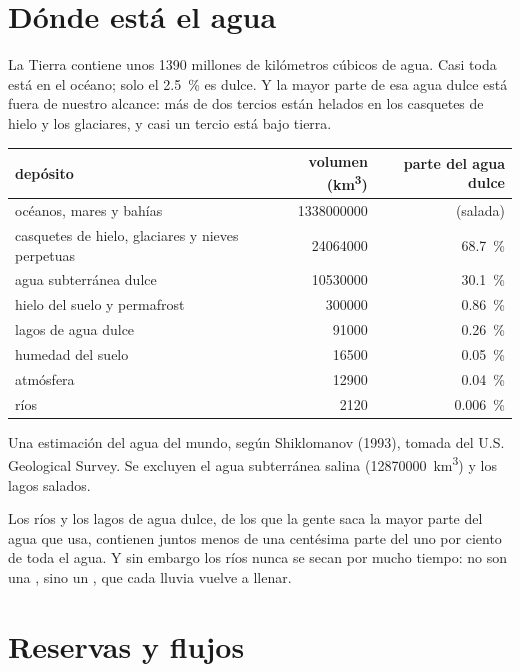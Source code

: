 \section{Dónde está el agua}

La Tierra contiene unos 1390 millones de kilómetros cúbicos de agua. Casi
toda está en el océano; solo el \qty{2.5}{\percent} es dulce. Y la mayor parte
de esa agua dulce está fuera de nuestro alcance: más de dos tercios están
helados en los casquetes de hielo y los glaciares, y casi un tercio está bajo
tierra.

\begin{center}
\small
\begin{tabular}{|l|r|r|}
\hline
\textbf{depósito} & \textbf{volumen (\unit{km^3})} & \textbf{parte del agua dulce} \\ \hline
océanos, mares y bahías & \num{1338000000} & (salada) \\ \hline
casquetes de hielo, glaciares y nieves perpetuas & \num{24064000} & \qty{68.7}{\percent} \\ \hline
agua subterránea dulce & \num{10530000} & \qty{30.1}{\percent} \\ \hline
hielo del suelo y permafrost & \num{300000} & \qty{0.86}{\percent} \\ \hline
lagos de agua dulce & \num{91000} & \qty{0.26}{\percent} \\ \hline
humedad del suelo & \num{16500} & \qty{0.05}{\percent} \\ \hline
atmósfera & \num{12900} & \qty{0.04}{\percent} \\ \hline
ríos & \num{2120} & \qty{0.006}{\percent} \\ \hline
\end{tabular}

{\small Una estimación del agua del mundo, según Shiklomanov (1993), tomada
del U.S. Geological Survey. Se excluyen el agua subterránea salina
(\num{12870000}~\unit{km^3}) y los lagos salados.}
\end{center}

Los ríos y los lagos de agua dulce, de los que la gente saca la mayor parte
del agua que usa, contienen juntos menos de una centésima parte del uno por
ciento de toda el agua. Y sin embargo los ríos nunca se secan por mucho
tiempo: no son una , sino un , que cada lluvia vuelve a llenar.

\section{Reservas y flujos}

